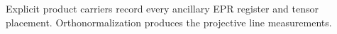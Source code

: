 
Explicit product carriers record every ancillary EPR register and tensor
placement. Orthonormalization produces the projective line measurements.


